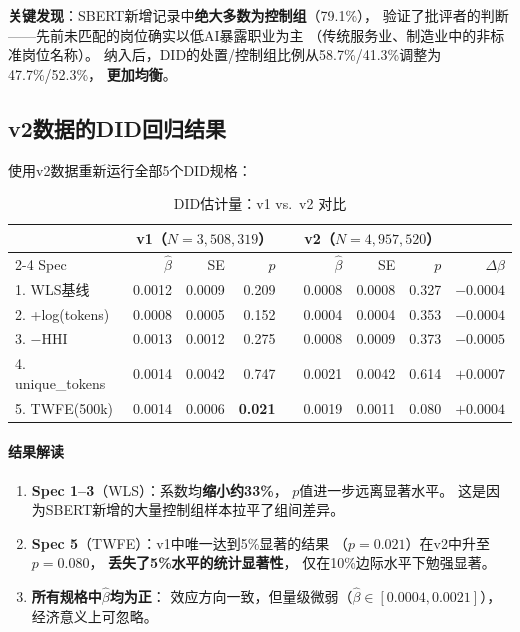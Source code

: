 \documentclass[12pt,a4paper]{ctexart}
\begin{document}
\textbf{关键发现}：SBERT新增记录中\textbf{绝大多数为控制组}（79.1\%），
验证了批评者的判断——先前未匹配的岗位确实以低AI暴露职业为主
（传统服务业、制造业中的非标准岗位名称）。
纳入后，DID的处置/控制组比例从58.7\%/41.3\%调整为47.7\%/52.3\%，
\textbf{更加均衡}。

\subsection{v2数据的DID回归结果}

使用v2数据重新运行全部5个DID规格：

\begin{table}[h!]
\centering
\caption{DID估计量：v1 vs.\ v2 对比}
\label{tab:did_v1v2}
\begin{tabular}{l rrr c rrr r}
\toprule
& \multicolumn{3}{c}{v1（$N=3{,}508{,}319$）} && \multicolumn{3}{c}{v2（$N=4{,}957{,}520$）} & \\
\cmidrule{2-4} \cmidrule{6-8}
Spec & $\hat{\beta}$ & SE & $p$ && $\hat{\beta}$ & SE & $p$ & $\Delta\beta$ \\
\midrule
1. WLS基线 & 0.0012 & 0.0009 & 0.209 && 0.0008 & 0.0008 & 0.327 & $-0.0004$ \\
2. +log(tokens) & 0.0008 & 0.0005 & 0.152 && 0.0004 & 0.0004 & 0.353 & $-0.0004$ \\
3. $-$HHI & 0.0013 & 0.0012 & 0.275 && 0.0008 & 0.0009 & 0.373 & $-0.0005$ \\
4. unique\_tokens & 0.0014 & 0.0042 & 0.747 && 0.0021 & 0.0042 & 0.614 & $+0.0007$ \\
5. TWFE(500k) & 0.0014 & 0.0006 & \textbf{0.021} && 0.0019 & 0.0011 & 0.080 & $+0.0004$ \\
\bottomrule
\end{tabular}
\end{table}

\paragraph{结果解读}

\begin{enumerate}
\item \textbf{Spec 1--3}（WLS）：系数均\textbf{缩小约33\%}，
      $p$值进一步远离显著水平。
      这是因为SBERT新增的大量控制组样本拉平了组间差异。
\item \textbf{Spec 5}（TWFE）：v1中唯一达到5\%显著的结果
      （$p=0.021$）在v2中升至$p=0.080$，
      \textbf{丢失了5\%水平的统计显著性}，
      仅在10\%边际水平下勉强显著。
\item \textbf{所有规格中$\hat{\beta}$均为正}：
      效应方向一致，但量级微弱（$\hat{\beta}\in[0.0004, 0.0021]$），
      经济意义上可忽略。
\end{enumerate}
\end{document}
